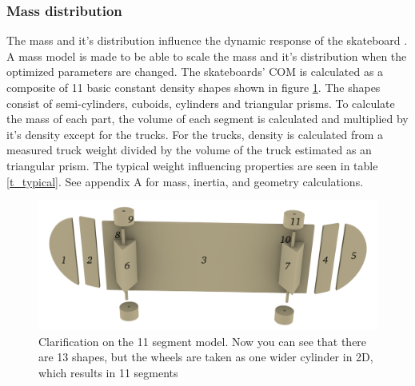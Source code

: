 \subsubsection{Mass distribution}\label{ss_mass}
\noindent The mass and it's distribution influence the dynamic response of the skateboard \cite{moore_force_nodate}. A mass model is made to be able to scale the mass and it's distribution when the optimized parameters are changed. The skateboards' COM is calculated as a composite of 11 basic constant density shapes shown in figure \ref{f_basicshapes}. The shapes consist of semi-cylinders, cuboids, cylinders and triangular prisms. To calculate the mass of each part, the volume of each segment is calculated and multiplied by it's density except for the trucks. For the trucks, density is calculated from a measured truck weight divided by the volume of the truck estimated as an triangular prism. The typical weight influencing properties are seen in table \ref{t_typical}. See appendix A for mass, inertia, and geometry calculations. 
\begin{figure}
    \centering
    \includegraphics[width = 0.5 \textwidth]{figure/Basicshapes.png}
    \caption[Exploded 11 segment model]{Clarification on the 11 segment model. Now you can see that there are 13 shapes, but the wheels are taken as one wider cylinder in 2D, which results in 11 segments}
    \label{f_basicshapes}
\end{figure}
